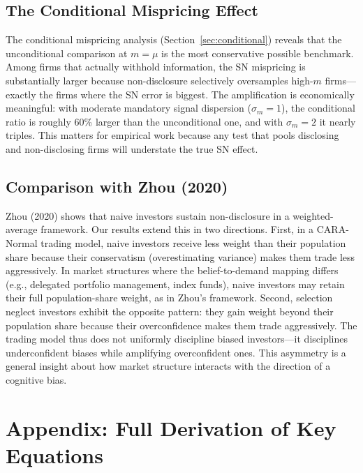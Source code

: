 \documentclass[12pt]{article}
\theoremstyle{plain}
\theoremstyle{definition}
\begin{document}
\subsection{The Conditional Mispricing Effect}

The conditional mispricing analysis (Section~\ref{sec:conditional}) reveals that the unconditional comparison at $m = \mu$ is the most conservative possible benchmark. Among firms that actually withhold information, the SN mispricing is substantially larger because non-disclosure selectively oversamples high-$m$ firms---exactly the firms where the SN error is biggest. The amplification is economically meaningful: with moderate mandatory signal dispersion ($\sigma_m = 1$), the conditional ratio is roughly 60\% larger than the unconditional one, and with $\sigma_m = 2$ it nearly triples. This matters for empirical work because any test that pools disclosing and non-disclosing firms will understate the true SN effect.

\subsection{Comparison with Zhou (2020)}

Zhou (2020) shows that naive investors sustain non-disclosure in a weighted-average framework. Our results extend this in two directions. First, in a CARA-Normal trading model, naive investors receive less weight than their population share because their conservatism (overestimating variance) makes them trade less aggressively. In market structures where the belief-to-demand mapping differs (e.g., delegated portfolio management, index funds), naive investors may retain their full population-share weight, as in Zhou's framework. Second, selection neglect investors exhibit the opposite pattern: they gain weight beyond their population share because their overconfidence makes them trade aggressively. The trading model thus does not uniformly discipline biased investors---it disciplines underconfident biases while amplifying overconfident ones. This asymmetry is a general insight about how market structure interacts with the direction of a cognitive bias.


\section{Appendix: Full Derivation of Key Equations}
\label{sec:appendix}
\end{document}
